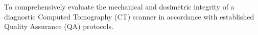 To comprehensively evaluate the mechanical and dosimetric integrity of a diagnostic Computed Tomography (CT) scanner in accordance with established Quality Assurance (QA) protocols.